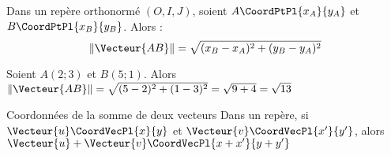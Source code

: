 \documentclass[a4paper]{article}
\begin{document}
\begin{definition}{}{}
  Dans un repère orthonormé $(O,I,J)$, soient $A\CoordPtPl{x_A}{y_A}$ et $B\CoordPtPl{x_B}{y_B}$. Alors :
  $$ \left\lVert \Vecteur{AB} \right\rVert = \sqrt{(x_B-x_A)^2+(y_B-y_A)^2} $$ 
\end{definition}

\begin{example}{}{}
  Soient $A(2;3)$ et $B(5;1)$. Alors $\left\lVert \Vecteur{AB} \right\rVert = \sqrt{(5-2)^2+(1-3)^2}=\sqrt{9+4}=\sqrt{13}$
\end{example}

\begin{propriete}{Coordonnées de la somme de deux vecteurs}{}
  Dans un repère, si $\Vecteur{u}\CoordVecPl{x}{y}$  et $\Vecteur{v}\CoordVecPl{x'}{y'}$, alors $\Vecteur{u}+\Vecteur{v}\CoordVecPl{x+x'}{y+y'}$
\end{propriete}
\end{document}
